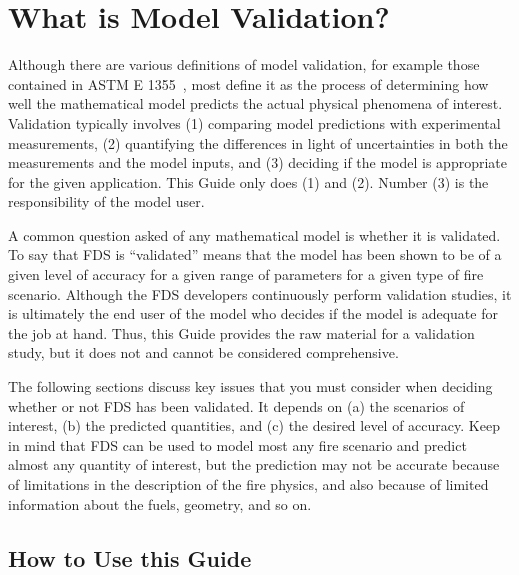 
\chapter{What is Model Validation?}

Although there are various definitions of model validation, for example those contained in
ASTM E 1355~\cite{ASTM:E1355}, most define it as the process of determining how well the mathematical model
predicts the actual physical phenomena of interest.
Validation typically involves (1) comparing model predictions with experimental measurements, (2) quantifying the differences in light of uncertainties in
both the measurements and the model inputs, and (3) deciding if the model is appropriate for the given application. This Guide only does (1) and (2). Number (3) is
the responsibility of the model user.

A common question asked of any mathematical model is whether it is validated. To say that FDS is
``validated'' means that the model has been shown to be of a given level of accuracy for a given range of parameters for a given
type of fire scenario. Although the FDS developers continuously perform validation studies, it is ultimately the end user of the model who
decides if the model is adequate for the job at hand. Thus, this Guide provides the raw material for a validation study, but it does not
and cannot be considered comprehensive.

The following sections discuss key issues that you must consider when deciding whether or not FDS has been validated. It depends on (a) the scenarios
of interest, (b) the predicted quantities, and (c) the desired level of accuracy. Keep in mind that FDS can be used to model most any fire scenario and predict almost
any quantity of interest, but the prediction may not be accurate because of limitations in the description of the fire physics, and also because of limited
information about the fuels, geometry, and so on.


\section{How to Use this Guide}

